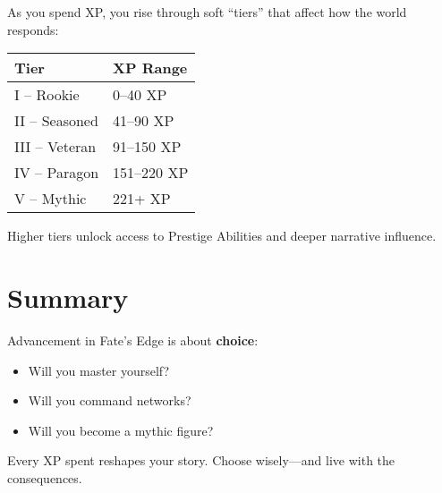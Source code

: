 As you spend XP, you rise through soft “tiers” that affect how the world responds:

\begin{center}
\begin{tabular}{ll}
\toprule
\textbf{Tier} & \textbf{XP Range} \\
\midrule
I – Rookie & 0–40 XP \\
II – Seasoned & 41–90 XP \\
III – Veteran & 91–150 XP \\
IV – Paragon & 151–220 XP \\
V – Mythic & 221+ XP \\
\bottomrule
\end{tabular}
\end{center}

Higher tiers unlock access to Prestige Abilities and deeper narrative influence.

\section{Summary}

Advancement in Fate’s Edge is about \textbf{choice}:

\begin{itemize}
  \item Will you master yourself?
  \item Will you command networks?
  \item Will you become a mythic figure?
\end{itemize}

Every XP spent reshapes your story. Choose wisely—and live with the consequences.

